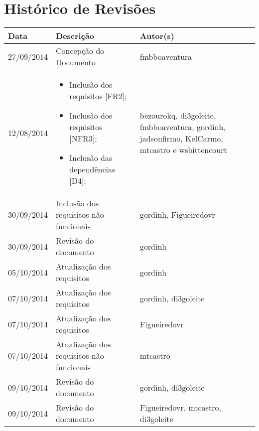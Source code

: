 \documentclass{article}
\begin{document}

\capa
\newpage

\section*{\center Histórico de Revisões}
  \vspace*{1cm}
  \begin{table}[ht]
    \centering
    \begin{tabular}[pos]{|m{2cm} | m{7.2cm} | m{3.8cm}|} 
      \hline
      \cellcolor[gray]{0.9}
      \textbf{Data} & \cellcolor[gray]{0.9}\textbf{Descrição} & \cellcolor[gray]{0.9}\textbf{Autor(s)}\\ \hline
      \hline
      \small 27/09/2014 & \small Concepção do Documento & \small fmbboaventura \\ \hline     
      \small 12/08/2014 &
      \begin{small}
        \begin{itemize}
          \item Inclusão dos requisitos [FR2];
          \item Inclusão dos requisitos [NFR3];
          \item Inclusão das dependências [D4];
        \end{itemize}
      \end{small} & \small bezourokq, di3goleite, fmbboaventura, gordinh, jadsonfirmo, KelCarmo, mtcastro e wsbittencourt \\ \hline
      \small 30/09/2014 & \small Inclusão dos requisitos não funcionais & \small gordinh, Figueiredovr \\ \hline
      \small 30/09/2014 & \small Revisão do documento & \small gordinh \\ \hline
      \small 05/10/2014 & \small Atualização dos requisitos & \small gordinh \\ \hline
      \small 07/10/2014 & \small Atualização dos requisitos & \small gordinh, di3goleite \\ \hline
      \small 07/10/2014 & \small Atualização dos requisitos & \small Figueiredovr \\ \hline
      \small 07/10/2014 & \small Atualização dos requisitos não-funcionais & \small mtcastro \\ \hline
      \small 09/10/2014 & \small Revisão do documento & \small gordinh, di3goleite \\ \hline
      \small 09/10/2014 & \small Revisão do documento & \small Figueiredovr, mtcastro, di3goleite \\ \hline      
    \end{tabular}
  \end{table}
\end{document}
